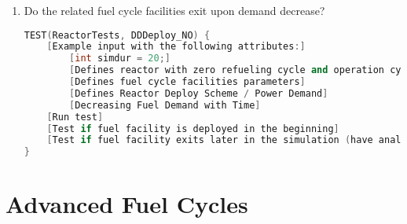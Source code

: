 \documentclass[12pt,letterpaper]{article}
\begin{document}
\begin{enumerate}
\item Do the related fuel cycle facilities exit upon demand decrease?
\begin{lstlisting}[language=C++, caption=Test demand-driven exit of fuel cycle facility]
TEST(ReactorTests, DDDeploy_NO) {
    [Example input with the following attributes:]
        [int simdur = 20;]
        [Defines reactor with zero refueling cycle and operation cycle of 1 month]
        [Defines fuel cycle facilities parameters]
        [Defines Reactor Deploy Scheme / Power Demand]
        [Decreasing Fuel Demand with Time]
    [Run test]
    [Test if fuel facility is deployed in the beginning]
    [Test if fuel facility exits later in the simulation (have analytic solution)]
}
\end{lstlisting}


\end{enumerate}





\section{Advanced Fuel Cycles}
\end{document}
